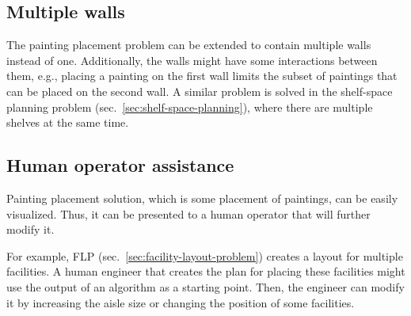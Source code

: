 \subsection{Multiple walls}\label{subsec:multiple-walls-for-painting-placement}

The painting placement problem can be extended to contain multiple walls instead of one.
Additionally, the walls might have some interactions between them, e.g., placing a painting on the first wall
limits the subset of paintings that can be placed on the second wall.
A similar problem is solved in the shelf-space planning problem (sec.~\ref{sec:shelf-space-planning}),
where there are multiple shelves at the same time.

\subsection{Human operator assistance}\label{subsec:human-operator-assistance}
Painting placement solution, which is some placement of paintings, can be easily visualized.
Thus, it can be presented to a human operator that will further modify it.

For example, FLP (sec.~\ref{sec:facility-layout-problem}) creates a layout for multiple facilities.
A human engineer that creates the plan for placing these facilities might use the output of an algorithm as a starting point.
Then, the engineer can modify it by increasing the aisle size or changing the position of some facilities.
